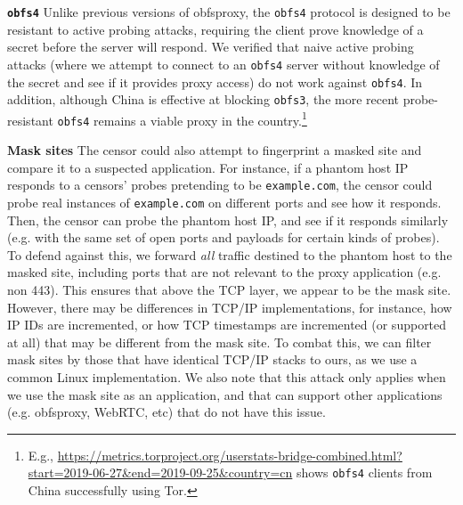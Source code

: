 \documentclass[sigconf]{acmart}
\renewcommand{\paragraph}[1]{\smallskip\noindent\textbf{#1\quad}}
\begin{document}

\paragraph{\texttt{obfs4}}
Unlike previous versions of obfsproxy, the \texttt{obfs4} protocol is designed to
be resistant to active probing
attacks, requiring the client prove knowledge of a secret before the server will
respond. We verified that naive active probing attacks (where we attempt to
connect to an \texttt{obfs4} server without knowledge of the secret and see if
it provides proxy access) do not work
against \texttt{obfs4}. In addition, although China is effective at blocking
\texttt{obfs3}, the more recent probe-resistant \texttt{obfs4} remains a viable
proxy in the country.\footnote{E.g., \url{https://metrics.torproject.org/userstats-bridge-combined.html?start=2019-06-27&end=2019-09-25&country=cn} shows \texttt{obfs4} clients from China successfully using Tor.}


\paragraph{Mask sites}
The censor could also attempt to fingerprint a masked site and compare it to a
suspected \scheme application. For instance, if a phantom host IP responds to a
censors' probes
pretending to be \texttt{example.com}, the censor could probe real instances
of \texttt{example.com} on different ports and see how it responds. Then, the
censor can probe the phantom host IP, and see if it responds similarly (e.g. with
the same set of open ports and payloads for certain kinds of probes). To defend
against this, we forward \emph{all} traffic destined to the phantom host to the
masked site, including ports that are not relevant to the proxy application
(e.g. non 443). This ensures that above the TCP layer, we appear to be the mask
site. However, there may be differences in TCP/IP implementations, for instance,
how IP IDs are incremented, or how TCP timestamps are incremented (or supported
at all) that may be different from the mask site. To combat this, we can filter
mask sites by those that have identical TCP/IP stacks to ours, as we use a
common Linux implementation. We also note that this attack only applies when we
use the mask site as an application, and that \scheme can support other
applications (e.g. obfsproxy, WebRTC, etc) that do not have this issue.
\end{document}
